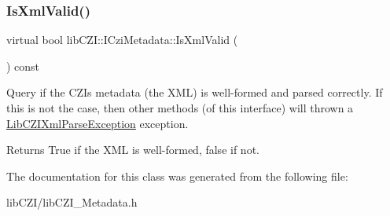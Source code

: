 \subsubsection{\texorpdfstring{Is\+Xml\+Valid()}{IsXmlValid()}}
{\footnotesize\ttfamily virtual bool lib\+C\+Z\+I\+::\+I\+Czi\+Metadata\+::\+Is\+Xml\+Valid (\begin{DoxyParamCaption}{ }\end{DoxyParamCaption}) const\hspace{0.3cm}{\ttfamily [pure virtual]}}

Query if the C\+ZI\textquotesingle{}s metadata (the X\+ML) is well-\/formed and parsed correctly. If this is not the case, then other methods (of this interface) will thrown a \hyperlink{classlib_c_z_i_1_1_lib_c_z_i_xml_parse_exception}{Lib\+C\+Z\+I\+Xml\+Parse\+Exception} exception.

\begin{DoxyReturn}{Returns}
True if the X\+ML is well-\/formed, false if not. 
\end{DoxyReturn}


The documentation for this class was generated from the following file\+:\begin{DoxyCompactItemize}
\item 
lib\+C\+Z\+I/lib\+C\+Z\+I\+\_\+\+Metadata.\+h\end{DoxyCompactItemize}
